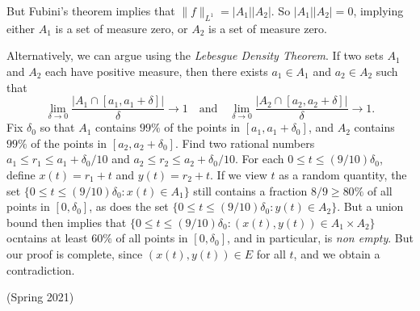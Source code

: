 \documentclass[answers]{exam}
\DeclareMathOperator{\RR}{\mathbb{R}}
\begin{document}
\begin{questions}
\begin{solution}
	But Fubini's theorem implies that $\| f \|_{L^1} = |A_1| |A_2|$. So $|A_1| |A_2| = 0$, implying either $A_1$ is a set of measure zero, or $A_2$ is a set of measure zero.

	Alternatively, we can argue using the \emph{Lebesgue Density Theorem}. If two sets $A_1$ and $A_2$ each have positive measure, then there exists $a_1 \in A_1$ and $a_2 \in A_2$ such that
	\[ \lim_{\delta \to 0} \frac{|A_1 \cap [a_1,a_1+\delta]|}{\delta} \to 1 \quad\text{and}\quad \lim_{\delta \to 0} \frac{|A_2 \cap [a_2,a_2+\delta]|}{\delta} \to 1. \]
	Fix $\delta_0$ so that $A_1$ contains $99\%$ of the points in $[a_1, a_1 + \delta_0]$, and $A_2$ contains $99\%$ of the points in $[a_2,a_2 + \delta_0]$. Find two rational numbers $a_1 \leq r_1 \leq a_1 + \delta_0 / 10$ and $a_2 \leq r_2 \leq a_2 + \delta_0 / 10$. For each $0 \leq t \leq (9/10) \delta_0$, define $x(t) = r_1 + t$ and $y(t) = r_2 + t$. If we view $t$ as a random quantity, the set $\{ 0 \leq t \leq (9/10) \delta_0 : x(t) \in A_1 \}$ still contains a fraction $8/9 \geq 80\%$ of all points in $[0,\delta_0]$, as does the set $\{ 0 \leq t \leq (9/10) \delta_0 : y(t) \in A_2 \}$. But a union bound then implies that $\{ 0 \leq t \leq (9/10) \delta_0 : (x(t),y(t)) \in A_1 \times A_2 \}$ ocntains at least $60\%$ of all points in $[0,\delta_0]$, and in particular, is \emph{non empty}. But our proof is complete, since $(x(t),y(t)) \in E$ for all $t$, and we obtain a contradiction.
\end{solution}






\question (Spring 2021)
\end{questions}
\end{document}
